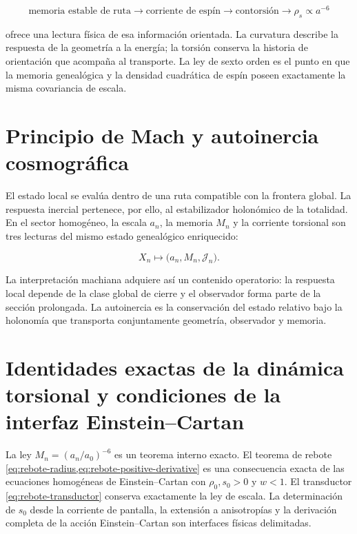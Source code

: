 \begin{equation}
 \text{memoria estable de ruta}
 \longrightarrow
 \text{corriente de esp\'in}
 \longrightarrow
 \text{contorsi\'on}
 \longrightarrow
 \rho_s\propto a^{-6}
 \label{eq:rebote-genealogy}
\end{equation}

ofrece una lectura f\'isica de esa informaci\'on orientada.  La curvatura
describe la respuesta de la geometr\'ia a la energ\'ia; la torsi\'on conserva
la historia de orientaci\'on que acompa\~na al transporte.  La ley de sexto
orden es el punto en que la memoria geneal\'ogica y la densidad cuadr\'atica de
esp\'in poseen exactamente la misma covariancia de escala.

\section{Principio de Mach y autoinercia cosmográfica}

El estado local se eval\'ua dentro de una ruta compatible con la frontera
global.  La respuesta inercial pertenece, por ello, al estabilizador
holon\'omico de la totalidad.  En el sector homog\'eneo, la escala \(a_n\), la
memoria \(M_n\) y la corriente torsional son tres lecturas del mismo estado
geneal\'ogico enriquecido:

\begin{equation}
 X_n\longmapsto
 \bigl(a_n,M_n,\mathcal J_n\bigr).
 \label{eq:rebote-mach-triple}
\end{equation}

La interpretaci\'on machiana adquiere as\'i un contenido operatorio: la
respuesta local depende de la clase global de cierre y el observador forma
parte de la secci\'on prolongada.  La autoinercia es la conservaci\'on del
estado relativo bajo la holonom\'ia que transporta conjuntamente geometr\'ia,
observador y memoria.

\section{Identidades exactas de la dinámica torsional y condiciones de la interfaz Einstein–Cartan}

\begin{proofstatusbox}
La ley \(M_n=(a_n/a_0)^{-6}\) es un teorema interno exacto.  El teorema de
rebote \cref{eq:rebote-radius,eq:rebote-positive-derivative} es una
consecuencia exacta de las ecuaciones homog\'eneas de Einstein--Cartan
\cite{Hehl1976} con
\(\rho_0,s_0>0\) y \(w<1\).  El transductor
\cref{eq:rebote-transductor} conserva exactamente la ley de escala.  La
determinaci\'on de \(s_0\) desde la corriente de pantalla, la extensi\'on a
anisotrop\'ias y la derivaci\'on completa de la acci\'on Einstein--Cartan son
interfaces f\'isicas delimitadas.
\end{proofstatusbox}

